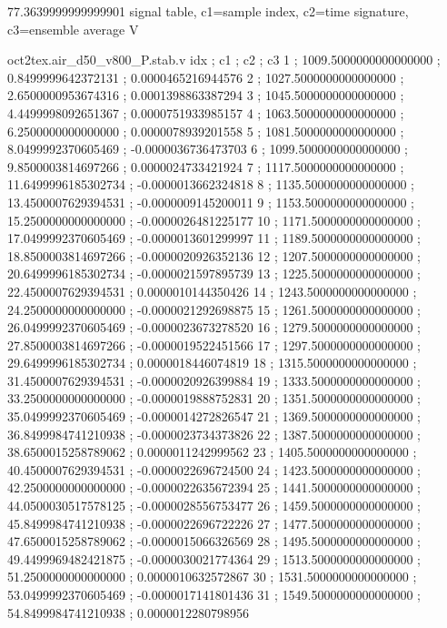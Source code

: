 \expandafter\def\csname oct2tex.air_d50_v800_P.hub.v\endcsname{77.3639999999999901}
\expandafter\def\csname oct2tex.air_d50_v800_P.stab.d\endcsname{signal table, c1=sample index, c2=time signature, c3=ensemble average}
\expandafter\def\csname oct2tex.air_d50_v800_P.stab.u\endcsname{\ensuremath{\text{V}}}
\begin{filecontents}[overwrite]{oct2tex.air_d50_v800_P.stab.v}
idx ; c1 ; c2 ; c3
1 ; 1009.5000000000000000 ; 0.8499999642372131 ; 0.0000465216944576
2 ; 1027.5000000000000000 ; 2.6500000953674316 ; 0.0001398863387294
3 ; 1045.5000000000000000 ; 4.4499998092651367 ; 0.0000751933985157
4 ; 1063.5000000000000000 ; 6.2500000000000000 ; 0.0000078939201558
5 ; 1081.5000000000000000 ; 8.0499992370605469 ; -0.0000036736473703
6 ; 1099.5000000000000000 ; 9.8500003814697266 ; 0.0000024733421924
7 ; 1117.5000000000000000 ; 11.6499996185302734 ; -0.0000013662324818
8 ; 1135.5000000000000000 ; 13.4500007629394531 ; -0.0000009145200011
9 ; 1153.5000000000000000 ; 15.2500000000000000 ; -0.0000026481225177
10 ; 1171.5000000000000000 ; 17.0499992370605469 ; -0.0000013601299997
11 ; 1189.5000000000000000 ; 18.8500003814697266 ; -0.0000020926352136
12 ; 1207.5000000000000000 ; 20.6499996185302734 ; -0.0000021597895739
13 ; 1225.5000000000000000 ; 22.4500007629394531 ; 0.0000010144350426
14 ; 1243.5000000000000000 ; 24.2500000000000000 ; -0.0000021292698875
15 ; 1261.5000000000000000 ; 26.0499992370605469 ; -0.0000023673278520
16 ; 1279.5000000000000000 ; 27.8500003814697266 ; -0.0000019522451566
17 ; 1297.5000000000000000 ; 29.6499996185302734 ; 0.0000018446074819
18 ; 1315.5000000000000000 ; 31.4500007629394531 ; -0.0000020926399884
19 ; 1333.5000000000000000 ; 33.2500000000000000 ; -0.0000019888752831
20 ; 1351.5000000000000000 ; 35.0499992370605469 ; -0.0000014272826547
21 ; 1369.5000000000000000 ; 36.8499984741210938 ; -0.0000023734373826
22 ; 1387.5000000000000000 ; 38.6500015258789062 ; 0.0000011242999562
23 ; 1405.5000000000000000 ; 40.4500007629394531 ; -0.0000022696724500
24 ; 1423.5000000000000000 ; 42.2500000000000000 ; -0.0000022635672394
25 ; 1441.5000000000000000 ; 44.0500030517578125 ; -0.0000028556753477
26 ; 1459.5000000000000000 ; 45.8499984741210938 ; -0.0000022696722226
27 ; 1477.5000000000000000 ; 47.6500015258789062 ; -0.0000015066326569
28 ; 1495.5000000000000000 ; 49.4499969482421875 ; -0.0000030021774364
29 ; 1513.5000000000000000 ; 51.2500000000000000 ; 0.0000010632572867
30 ; 1531.5000000000000000 ; 53.0499992370605469 ; -0.0000017141801436
31 ; 1549.5000000000000000 ; 54.8499984741210938 ; 0.0000012280798956

\end{filecontents}
